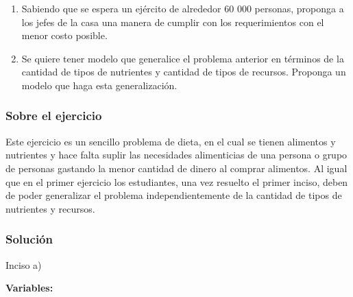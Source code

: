 \documentclass[a4paper,10pt,twocolumn]{article}
\theoremstyle{theorem}
\theoremstyle{definition}
\theoremstyle{remark}
\begin{document}
\renewcommand{\theenumi}{\alph{enumi}} %

\begin{enumerate}

	\item Sabiendo que se espera un ejército de alrededor 60 000 personas, proponga a los jefes de la casa una manera de cumplir con los 
	requerimientos con el menor costo posible.
	\item Se quiere tener modelo que generalice el problema anterior en términos de la cantidad de tipos de nutrientes y cantidad de tipos de 
	recursos. Proponga un modelo que haga esta generalización.

\end{enumerate}

		\subsubsection{Sobre el ejercicio}\label{subsubsec:sobre_ejer_2}

Este ejercicio es un sencillo problema de dieta, en el cual se tienen alimentos y nutrientes y hace falta suplir las necesidades alimenticias de una persona o grupo de personas gastando la menor cantidad de dinero al comprar alimentos. Al igual que en el primer ejercicio los estudiantes, una vez resuelto el primer inciso, deben de poder generalizar el problema independientemente de la cantidad de tipos de nutrientes y recursos.

		\subsubsection{Solución}\label{subsubsec:sol_ejer_2}

Inciso a)

\textbf{Variables:}
\end{document}
